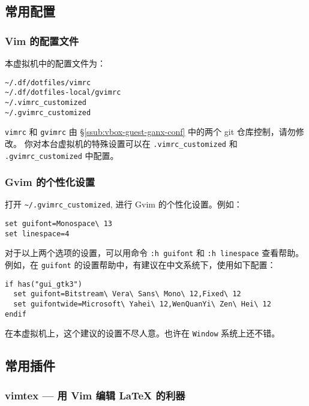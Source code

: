 \documentclass[
    11pt,
    cite=authoryear,
    device=normal,
    lang=cn,
    mode=simple,
    result=answer,
    toc=onecol,
]{elegantbook_sierxue}
\begin{document}
\subsection{常用配置}%
\label{sub:vim-intro}

\subsubsection{Vim 的配置文件}%
\label{ssub:vim-config}

本虚拟机中的配置文件为：
\begin{lstlisting}[escapeinside=``]
~/.df/dotfiles/vimrc
~/.df/dotfiles-local/gvimrc
~/.vimrc_customized
~/.gvimrc_customized
\end{lstlisting}
\lstinline{vimrc} 和 \lstinline{gvimrc} 由
\S\ref{ssub:vbox-guest-ganx-conf} 中的两个 git 仓库控制，请勿修改。
你对本台虚拟机的特殊设置可以在 \lstinline{.vimrc_customized} 和
\lstinline{.gvimrc_customized} 中配置。

\subsubsection{Gvim 的个性化设置}%
\label{ssub:vim-gui-config-customized}

打开 \lstinline{~/.gvimrc_customized}, 进行 Gvim 的个性化设置。例如：
\begin{lstlisting}[escapeinside=``]
set guifont=Monospace\ 13
set linespace=4
\end{lstlisting}
对于以上两个选项的设置，可以用命令 \lstinline{:h guifont} 和
\lstinline{:h linespace} 查看帮助。
例如，在 \lstinline{guifont} 的设置帮助中，有建议在中文系统下，使用如下配置：
\begin{lstlisting}[escapeinside=``]
if has("gui_gtk3")
  set guifont=Bitstream\ Vera\ Sans\ Mono\ 12,Fixed\ 12
  set guifontwide=Microsoft\ Yahei\ 12,WenQuanYi\ Zen\ Hei\ 12
endif
\end{lstlisting}
\begin{note}\label{note:guifont}
    在本虚拟机上，这个建议的设置不尽人意。也许在 \lstinline{Window}
    系统上还不错。
\end{note}

\subsection{常用插件}%
\label{sub:vim-plugins}

\subsubsection{vimtex --- 用 Vim 编辑 \LaTeX{} 的利器}%
\label{ssub:vim-plugin-vimtex}
\end{document}
